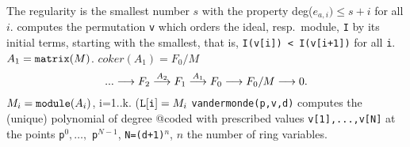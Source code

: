The regularity is the smallest number $s$ with the property deg($e_{a,i})
 \leq s+i$ for all $i$.
computes the permutation {\tt v}
which orders the ideal, resp.\ module, {\tt I} by its initial terms,
starting with the smallest, that is, {\tt I(v[i]) < I(v[i+1])} for all
{\tt i}.
$A_1={\tt matrix}(M)$.
$coker(A_1)=F_0/M$
$$...\longrightarrow F_2 \buildrel{A_2}\over{\longrightarrow} F_1 \buildrel{A_1}\over{\longrightarrow} F_0\longrightarrow F_0/M\longrightarrow 0.$$
$M_i={\tt module}(A_i)$, i=1..k.
(${\tt L[i]}=M_i$
{\tt vandermonde(p,v,d)} computes the (unique) polynomial of degree
@code{d} with prescribed values {\tt v[1],...,v[N]} at the points
{\tt p}$^0,\dots,$ {\tt p}$^{N-1}$, {\tt N=(d+1)}$^n$, $n$ the
number of ring variables.

